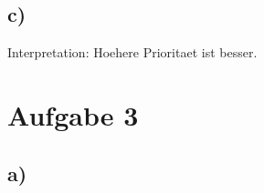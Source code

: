 \documentclass[a4paper,11pt,parskip=half]{scrartcl}
\begin{document}
\subsection*{c)}

Interpretation: Hoehere Prioritaet ist besser.

\begin{blockgraph}{20}{4}{0.7}



\end{blockgraph}

\section*{Aufgabe 3}

\subsection*{a)}
\end{document}

